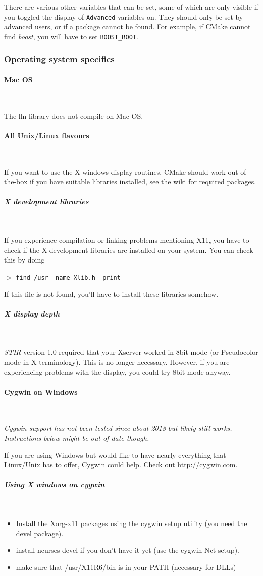 \documentclass{article}
\newcommand{\subsubsubsection}[1]{\paragraph{#1}\mbox{} \\}
\newcommand{\subsubsubsubsection}[1]{\subparagraph{#1} \mbox{} \\}
\newcommand{\cmdline}[1]{\par \noindent $>$ \texttt{#1}\par}
\begin{document}
There are various other variables that can be set, some of which are only visible if you toggled
the display of \texttt{Advanced} variables on. They should only be set by advanced users, or if a package
cannot be found. For example, if CMake cannot find \textit{boost}, you will have to set \texttt{BOOST\_ROOT}.

\subsubsection{
Operating system specifics}

{ \subsubsubsection{Mac OS}
}

The lln library does not compile on Mac OS. 

{ \subsubsubsection{All Unix/Linux flavours}
}

If you want to use the X windows display routines,  CMake
should work out-of-the-box if you have suitable libraries installed, see the wiki
for required packages.

{ \subsubsubsubsection{X development libraries}
}

If you experience compilation 
or linking problems mentioning X11, you have to check if the 
X development libraries are installed on your system. You can 
check this by doing
\cmdline{find /usr -name Xlib.h -print}

If this file is not found, you'll have to install these libraries 
somehow.

{ \subsubsubsubsection{X display depth}
}

\textit{STIR} version 1.0 required that your Xserver worked in 8bit 
mode (or Pseudocolor mode in X terminology). This is no longer 
necessary. However, if you are experiencing problems with the 
display, you could try 8bit mode anyway.



{ \subsubsubsection{Cygwin on Windows}
}
\textit{Cygwin support has not been tested since about 2018 but likely still works. Instructions below might be out-of-date though.}

If you are using Windows but would like 
to have nearly everything that Linux/Unix has to offer, Cygwin could help. Check out http://cygwin.com.

{ \subsubsubsubsection{Using X windows on cygwin}
}
\begin{itemize}
\item Install the Xorg-x11 packages using the cygwin setup utility 
(you need the devel package).
\item 
install ncurses-devel if you don't have it yet (use the cygwin 
Net setup).
\item make sure that /usr/X11R6/bin is in your PATH (necessary 
for DLLs)
\end{itemize}
\end{document}
